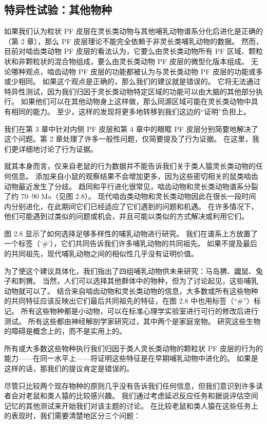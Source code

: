 \subsection{特异性试验：其他物种} 
如果我们认为粒状 PF 皮层在灵长类动物与其他哺乳动物谱系分化后进化是正确的（第 2 章），那么 PF 皮层理论不能完全依赖于非灵长类哺乳动物的数据。 然而，目前对啮齿类动物 PF 皮层的看法认为，它要么由灵长类动物所有 PF 区域、颗粒状和非颗粒状的混合物组成，要么由灵长类动物 PF 皮层的微型化版本组成。 无论哪种观点，啮齿动物 PF 皮层的功能都被认为与灵长类动物 PF 皮层的功能或多或少相同。 如果这个观点是正确的，那么我们的建议就是错误的。 它将无法通过特异性测试，因为我们归因于灵长类动物特定区域的功能可以由大脑的其他部分执行。 如果他们可以在其他动物身上这样做，那么同源区域可能在灵长类动物中具有相同的能力。 至少，这样的发现将更多地转移到我们这边的“证明”负担上。
\par 
我们在第 3 章中针对内侧 PF 皮层和第 4 章中的眼眶 PF 皮层分别简要地解决了这个问题。第 2 章处理了许多一般性问题，仅简要提及了行为证据。 在这里，我们更详细地讨论了行为证据。
\par 
就其本身而言，仅来自老鼠的行为数据并不能告诉我们关于类人猿灵长类动物的任何信息。 添加来自小鼠的观察结果不会增加更多，因为这些密切相关的鼠类啮齿动物最近发生了分歧。 趋同和平行进化很常见，啮齿动物和灵长类动物谱系分裂了约 70–90 Ma（见图 2.8）。 现代啮齿类动物和灵长类动物因此在很长一段时间内分别进化，在此期间它们已经适应了它们遇到的问题和机遇。 在许多情况下，他们可能遇到过类似的问题或机会，并且可能以类似的方式解决或利用它们。
\par 
图 2.8 显示了如何选择足够多样性的哺乳动物进行研究。 我们在谱系上方放置了一个标签（‘#’），它们共同告诉我们许多哺乳动物的共同祖先。 如果不提及最后的共同祖先，现代哺乳动物之间的相似性几乎没有证明价值。
\par 
为了使这个建议具体化，我们指出了四组哺乳动物供未来研究：马岛猬、鼹鼠、兔子和刺猬。 当然，人们可以选择其他群体中的物种，但为了讨论起见，这些哺乳动物就可以了。 结合来自啮齿动物和灵长类动物的信息，大多数或所有这些物种的共同特征应该反映出它们最后共同祖先的特征，在图 2.8 中也用标签（“#”）标记。 所有这些物种都是小动物，可以在标准心理学实验室进行可行的修改后进行测试。 所有这些都由神经解剖学家研究过，其中两个是家庭宠物。 研究这些生物的障碍是概念上的，而不是实用上的。
\par 
所有或大多数这些物种执行我们归因于类人灵长类动物的颗粒状 PF 皮层的行为的能力——在同一水平上——将证明这些特征是在早期哺乳动物中进化的。 如果是这样的话，那我们的提议肯定是错误的。
\par 
尽管只比较两个现存物种的原则几乎没有告诉我们任何信息，但我们意识到许多读者会对老鼠和类人猿的比较感兴趣。 我们通过考虑延迟反应任务和据说评估空间记忆的其他测试来开始我们对该主题的讨论。 在比较老鼠和类人猿在这些任务上的表现时，我们需要清楚地区分三个问题：

